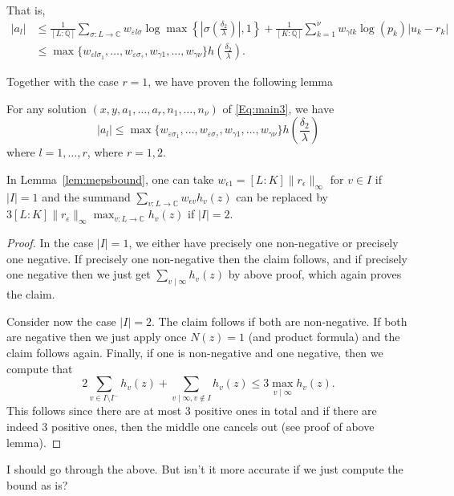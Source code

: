  That is, 
\begin{align*}
|a_l|	& \leq \frac{1}{[L:\mathbb{Q}]}\sum_{\sigma :L \to \mathbb{C}} w_{\varepsilon l \sigma}\log \max \left\{ \left|\sigma\left(\frac{\delta_2}{\lambda}\right)\right|, 1\right\} + \frac{1}{[K:\mathbb{Q}]}\sum_{k = 1}^{\nu} w_{\gamma l k}\log(p_k)|u_k - r_k|\\
	& \leq \max\{w_{\varepsilon l \sigma_1}, \dots, w_{\varepsilon \sigma_{?}}, w_{\gamma 1}, \dots, w_{\gamma \nu}\} h\left(\frac{\delta_2}{\lambda}\right).
\end{align*}

Together with the case $r = 1$, we have proven the following lemma
\begin{lemma}\label{lem:mepsbound}
For any solution $(x,y,a_1, \dots, a_r, n_1, \dots, n_{\nu})$ of \eqref{Eq:main3}, we have
\[|a_l| \leq \max\{w_{\varepsilon \sigma_1}, \dots, w_{\varepsilon \sigma_{?}}, w_{\gamma 1}, \dots, w_{\gamma \nu}\} h\left(\frac{\delta_2}{\lambda}\right)\]
where $l = 1, \dots, r$, where $r = 1, 2$. 
\end{lemma}

\begin{remark}\label{rem:i12}
In Lemma~\ref{lem:mepsbound},  one can take $w_{\epsilon 1}=[L:K]\|r_\epsilon\|_\infty$ for $v\in I$ if $|I|=1$ and the summand $\sum_{v:L\to \mathbb{C}}w_{\epsilon v}h_v(z)$ can be replaced by $3[L:K]\|r_\epsilon\|_\infty\max_{v:L\to\mathbb{C}}h_v(z)$ if $|I|=2$.
\end{remark}
\begin{proof}
In the case $|I|=1$, we  either have precisely one non-negative or precisely one negative. If precisely one non-negative then the claim follows, and if precisely one negative then we just get $\sum_{v\mid\infty}h_v(z)$ by above proof, which again proves the claim.

Consider now the case $|I|=2$. The claim follows if both are non-negative. If both are negative then we just apply once $N(z)=1$ (and product formula) and the claim follows again. Finally, if one is non-negative and one negative, then we compute that $$2\sum_{v\in I\setminus I^-}h_v(z)+\sum_{v\mid \infty,v\notin I}h_v(z)\leq 3\max_{v\mid \infty}h_v(z).$$ This follows since there are at most 3 positive ones in total and if there are indeed 3 positive ones, then the middle one cancels out (see proof of above lemma).
\end{proof}

\begin{question}
I should go through the above. But isn't it more accurate if we just compute the bound as is?
\end{question}

